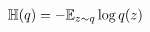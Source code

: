 \documentclass[a4paper,10pt,twocolumn]{article}
\newcommand{\conj}[1]{\overline{#1}}
\begin{document}
\begin{align}
  \mathbb{H}(q)
    & = - \mathbb{E}_{z \sim q} \log{q(z)}
    \notag \\

\end{align}
\end{document}
